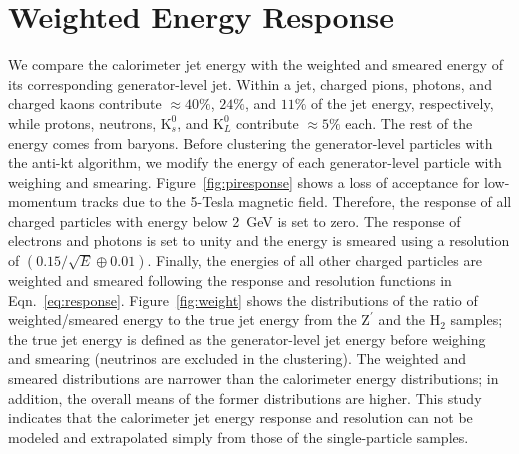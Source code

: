 \documentclass{PoS}
\begin{document}
\section{Weighted Energy Response \label{sec:weight}}
We compare the calorimeter jet energy with the weighted 
and smeared energy of its corresponding generator-level jet. 
Within a jet, charged pions, photons, and charged kaons 
contribute $\approx 40\%$, $24\%$, and $11\%$ of the jet energy, respectively, 
while protons, neutrons, $\mathrm{K}_{s}^0$, and $\mathrm{K}_{L}^0$ contribute 
$\approx 5\%$ each. The rest of the energy comes from baryons. 
Before clustering the generator-level particles with the anti-kt algorithm, 
we modify the energy of each generator-level particle with weighing and 
smearing. %
Figure~\ref{fig:piresponse} shows a 
loss of acceptance for low-momentum tracks due to the 5-Tesla magnetic field. 
Therefore, the response of all charged particles with energy below 2~GeV is 
set to zero. The response of electrons and photons 
is set to unity and the energy is smeared using a resolution 
of $\left(0.15/\sqrt{E} \oplus 0.01\right)$. Finally, the energies
of all other charged particles are weighted and smeared 
following the response and resolution functions in 
Eqn.~\ref{eq:response}. 
%
Figure~\ref{fig:weight} shows the distributions of the ratio of 
weighted/smeared energy to the true jet energy from the $\mathrm{Z}^{\prime}$ 
and the $\mathrm{H}_2$ samples; the true jet energy is defined as the 
generator-level jet energy before weighing and smearing (neutrinos are 
excluded in the clustering). The weighted and smeared distributions are 
narrower than the calorimeter energy distributions; in addition, the overall 
means of the former distributions are higher. This study indicates that the 
calorimeter jet energy response and resolution can not be modeled and 
extrapolated simply from those of the single-particle samples. 

\end{document}
